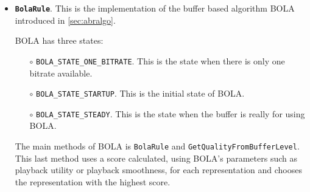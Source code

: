 \begin{itemize}
  \item \textbf{\texttt{BolaRule}}. This is the implementation of the buffer based algorithm
  BOLA introduced in \autoref{sec:abralgo}.

  BOLA has three states:
  \begin{itemize}[noitemsep, topsep=0pt]
    \item[$\circ$] \texttt{BOLA\_STATE\_ONE\_BITRATE}. This is the state when there is only one bitrate available.
    \item[$\circ$] \texttt{BOLA\_STATE\_STARTUP}. This is the initial state of BOLA.
    \item[$\circ$] \texttt{BOLA\_STATE\_STEADY}. This is the state when the buffer is really for using BOLA.
  \end{itemize}

  The main methods of BOLA is \texttt{BolaRule} and \texttt{GetQualityFromBufferLevel}.
  This last method uses a score calculated, using BOLA's parameters such as playback utility or 
  playback smoothness, for each representation and chooses the representation
  with the highest score.
\end{itemize}





